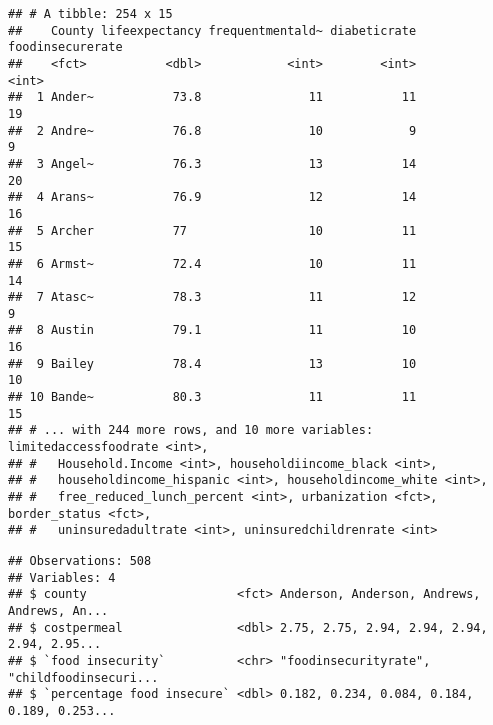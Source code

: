 \documentclass[]{article}
\newenvironment{Shaded}{\begin{snugshade}}{\end{snugshade}}
\newcommand{\CommentTok}[1]{\textcolor[rgb]{0.56,0.35,0.01}{\textit{#1}}}
\newcommand{\DataTypeTok}[1]{\textcolor[rgb]{0.13,0.29,0.53}{#1}}
\newcommand{\KeywordTok}[1]{\textcolor[rgb]{0.13,0.29,0.53}{\textbf{#1}}}
\newcommand{\NormalTok}[1]{#1}
\newcommand{\OperatorTok}[1]{\textcolor[rgb]{0.81,0.36,0.00}{\textbf{#1}}}
\newcommand{\StringTok}[1]{\textcolor[rgb]{0.31,0.60,0.02}{#1}}
\begin{document}
\begin{verbatim}
## # A tibble: 254 x 15
##    County lifeexpectancy frequentmentald~ diabeticrate foodinsecurerate
##    <fct>           <dbl>            <int>        <int>            <int>
##  1 Ander~           73.8               11           11               19
##  2 Andre~           76.8               10            9                9
##  3 Angel~           76.3               13           14               20
##  4 Arans~           76.9               12           14               16
##  5 Archer           77                 10           11               15
##  6 Armst~           72.4               10           11               14
##  7 Atasc~           78.3               11           12                9
##  8 Austin           79.1               11           10               16
##  9 Bailey           78.4               13           10               10
## 10 Bande~           80.3               11           11               15
## # ... with 244 more rows, and 10 more variables: limitedaccessfoodrate <int>,
## #   Household.Income <int>, householdiincome_black <int>,
## #   householdincome_hispanic <int>, householdincome_white <int>,
## #   free_reduced_lunch_percent <int>, urbanization <fct>, border_status <fct>,
## #   uninsuredadultrate <int>, uninsuredchildrenrate <int>
\end{verbatim}

\begin{Shaded}
\end{Shaded}

\begin{verbatim}
## Observations: 508
## Variables: 4
## $ county                     <fct> Anderson, Anderson, Andrews, Andrews, An...
## $ costpermeal                <dbl> 2.75, 2.75, 2.94, 2.94, 2.94, 2.94, 2.95...
## $ `food insecurity`          <chr> "foodinsecurityrate", "childfoodinsecuri...
## $ `percentage food insecure` <dbl> 0.182, 0.234, 0.084, 0.184, 0.189, 0.253...
\end{verbatim}
\end{document}
